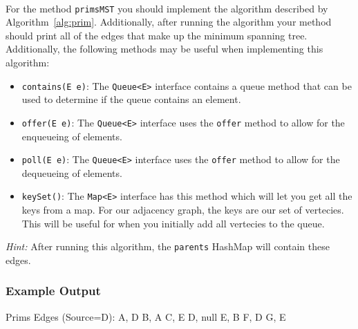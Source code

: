 ~\\
For the method \lstinline|primsMST| you should implement the algorithm
described by Algorithm~\ref{alg:prim}. Additionally, after running the 
algorithm your method should print all of the edges that make up the 
minimum spanning tree. Additionally, the following methods may be useful
when implementing this algorithm:
\begin{itemize}
    \item \lstinline|contains(E e)|: The \lstinline|Queue<E>| interface contains a queue method that can be used to determine if the queue contains an element.
    \item \lstinline|offer(E e)|: The \lstinline|Queue<E>| interface uses the \lstinline|offer| method to allow for the enqueueing of elements.
    \item \lstinline|poll(E e)|: The \lstinline|Queue<E>| interface uses the \lstinline|offer| method to allow for the dequeueing of elements.
    \item \lstinline|keySet()|: The \lstinline|Map<E>| interface has this method which will let you get all the keys from a map. For our adjacency graph, the keys are our set of vertecies. This will be useful for when you initially add all vertecies to the queue.
\end{itemize}

\textit{Hint:} After running this algorithm, the \lstinline|parents| HashMap
will contain these edges.

\subsubsection*{Example Output}

\begin{shell}
Prims Edges (Source=D):
A, D
B, A
C, E
D, null
E, B
F, D
G, E
\end{shell}
